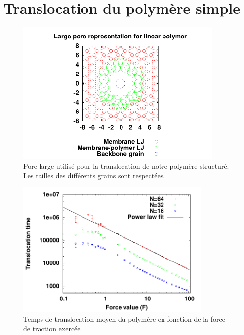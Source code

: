 \section{Translocation du polymère simple}

\begin{figure}[H]
\begin{center}
\includegraphics[width=0.9\textwidth]{simplepolpore.pdf}


\caption[Polymère simple dans le pore]{Pore large utilisé pour la translocation de notre polymère structuré. Les tailles des différents grains sont respectées. }
\label{porelargesimplepol}
\end{center}
\end{figure}




 
 
\begin{figure}[H]
\begin{center}
\includegraphics[width=0.85\textwidth]{translocpolsimple.pdf} 
\caption[Temps de translocation du polymère simple]{Temps de translocation moyen du polymère en fonction de la force de traction exercée.}
\label{taupolsimple}
\end{center}
\end{figure}

